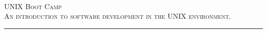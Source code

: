 \begin{center}
\ \\[5cm]
\textsc{\LARGE UNIX Boot Camp} \\[1cm]
\textsc{\Large An introduction to software development in the UNIX environment.}
\rule{\linewidth}{0.5mm}\\[3cm]


\vfill
\flushright{\today}

\end{center}
\thispagestyle{empty}
